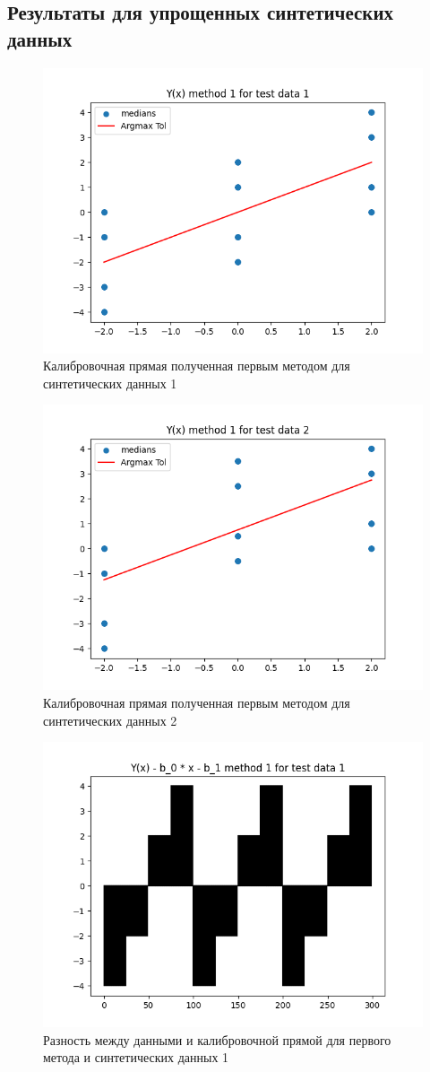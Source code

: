 \subsection{Результаты для упрощенных синтетических данных}

\begin{figure}[H]
    \centering
    \includegraphics[width=0.7\linewidth]{image/test_1_method_1.png}
    \caption{Калибровочная прямая полученная первым методом для синтетических данных 1}
    \label{fig:test_1_method_1}
\end{figure}

\begin{figure}[H]
    \centering
    \includegraphics[width=0.7\linewidth]{image/test_2_method_1.png}
    \caption{Калибровочная прямая полученная первым методом для синтетических данных 2}
    \label{fig:test_2_method_1}
\end{figure}

\begin{figure}[H]
    \centering
    \includegraphics[width=0.7\linewidth]{image/test_1_method_1_difference.png}
    \caption{Разность между данными и калибровочной прямой для первого метода и синтетических данных 1}
    \label{fig:test_1_method_1_difference}
\end{figure}

